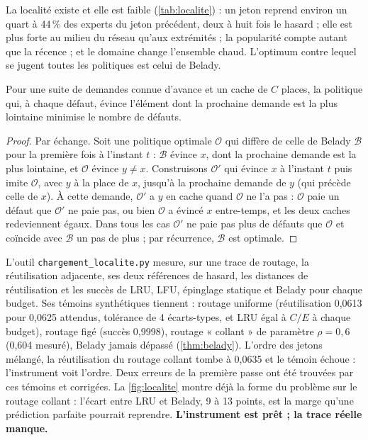 La localité existe et elle est faible (\cref{tab:localite}) : un jeton reprend environ un quart à 44\,\% des experts du jeton précédent, deux à huit fois le hasard ; elle est plus forte au milieu du réseau qu'aux extrémités ; la popularité compte autant que la récence ; et le domaine change l'ensemble chaud. L'optimum contre lequel se jugent toutes les politiques est celui de Belady.

\begin{theoreme}\label{thm:belady}
Pour une suite de demandes connue d'avance et un cache de $C$ places, la politique qui, à chaque défaut, évince l'élément dont la prochaine demande est la plus lointaine minimise le nombre de défauts.
\end{theoreme}

\begin{proof}
Par échange. Soit une politique optimale $\mathcal O$ qui diffère de celle de Belady $\mathcal B$ pour la première fois à l'instant $t$ : $\mathcal B$ évince $x$, dont la prochaine demande est la plus lointaine, et $\mathcal O$ évince $y \ne x$. Construisons $\mathcal O'$ qui évince $x$ à l'instant $t$ puis imite $\mathcal O$, avec $y$ à la place de $x$, jusqu'à la prochaine demande de $y$ (qui précède celle de $x$). À cette demande, $\mathcal O'$ a $y$ en cache quand $\mathcal O$ ne l'a pas : $\mathcal O$ paie un défaut que $\mathcal O'$ ne paie pas, ou bien $\mathcal O$ a évincé $x$ entre-temps, et les deux caches redeviennent égaux. Dans tous les cas $\mathcal O'$ ne paie pas plus de défauts que $\mathcal O$ et coïncide avec $\mathcal B$ un pas de plus ; par récurrence, $\mathcal B$ est optimale.
\end{proof}

L'outil \texttt{chargement\_localite.py} mesure, sur une trace de routage, la réutilisation adjacente, ses deux références de hasard, les distances de réutilisation et les succès de LRU, LFU, épinglage statique et Belady pour chaque budget. Ses témoins synthétiques tiennent : routage uniforme (réutilisation 0,0613 pour 0,0625 attendus, tolérance de 4 écarts-types, et LRU égal à $C/E$ à chaque budget), routage figé (succès 0,9998), routage « collant » de paramètre $\rho = 0{,}6$ (0,604 mesuré), Belady jamais dépassé (\cref{thm:belady}). L'ordre des jetons mélangé, la réutilisation du routage collant tombe à 0,0635 et le témoin échoue : l'instrument voit l'ordre. Deux erreurs de la première passe ont été trouvées par ces témoins et corrigées. La \cref{fig:localite} montre déjà la forme du problème sur le routage collant : l'écart entre LRU et Belady, 9 à 13 points, est la marge qu'une prédiction parfaite pourrait reprendre. \textbf{L'instrument est prêt ; la trace réelle manque.}

